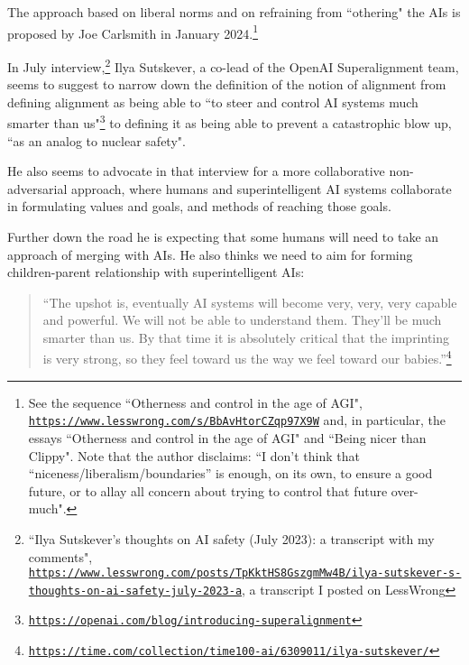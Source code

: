 \documentclass{article}
\begin{document}
The approach based on liberal norms and on refraining from ``othering" the AIs is proposed by Joe Carlsmith in January 
2024.\footnote{See the sequence ``Otherness and control in the age of AGI",
\href{https://www.lesswrong.com/s/BbAvHtorCZqp97X9W}{\tt https://www.lesswrong.com/s/BbAvHtorCZqp97X9W}
and, in particular, the essays ``Otherness and control in the age of AGI" and
``Being nicer than Clippy". Note that the author disclaims: ``I don’t think that “niceness/liberalism/boundaries” is enough, 
on its own, to ensure a good future, or to allay all concern about trying to control that future over-much".}

In July interview,\footnote{``Ilya Sutskever's thoughts on AI safety (July 2023): a transcript with my comments",\\
\href{https://www.lesswrong.com/posts/TpKktHS8GszgmMw4B/ilya-sutskever-s-thoughts-on-ai-safety-july-2023-a}
{\tt https://www.lesswrong.com/posts/TpKktHS8GszgmMw4B/ilya-sutskever-s-thoughts-on-ai-safety-july-2023-a},
a transcript I posted on LessWrong} Ilya Sutskever, a co-lead of the OpenAI Superalignment team,
seems to suggest to narrow down the definition of the notion of alignment from defining alignment as being able to
``to steer and control AI systems much smarter than 
us"\footnote{\href{https://openai.com/blog/introducing-superalignment}{\tt https://openai.com/blog/introducing-superalignment}}
to defining it as being able to prevent a catastrophic blow up, ``as an analog to nuclear safety".

He also seems to advocate in that interview for a more collaborative non-adversarial approach, where humans and superintelligent AI systems collaborate in formulating values and goals, and methods of reaching those goals.

Further down the road he is expecting that some humans will need to take an approach of merging
with AIs. He also thinks we need to aim for forming children-parent relationship with superintelligent AIs:

\begin{quote}
{\small ``The upshot is, eventually AI systems will become very, very, very capable and powerful. 
We will not be able to understand them. 
They’ll be much smarter than us. 
By that time it is absolutely critical that the imprinting is very strong, so they feel toward us the way we feel toward our babies.”}\footnote{\href{https://time.com/collection/time100-ai/6309011/ilya-sutskever/}
{\tt https://time.com/collection/time100-ai/6309011/ilya-sutskever/}}
\end{quote}
\end{document}
